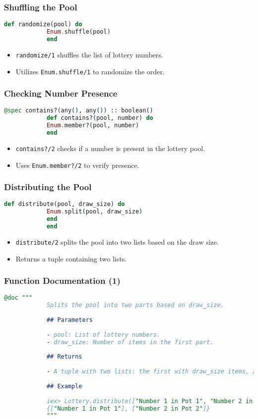 \documentclass[aspectratio=169, table]{beamer}
\begin{document}
	\begin{frame}[fragile]
		\frametitle{Shuffling the Pool}
		\begin{lstlisting}[language=Elixir]
			def randomize(pool) do
			Enum.shuffle(pool)
			end
		\end{lstlisting}
		\begin{itemize}
			\item \texttt{randomize/1} shuffles the list of lottery numbers.
			\item Utilizes \texttt{Enum.shuffle/1} to randomize the order.
		\end{itemize}
	\end{frame}
	
	\begin{frame}[fragile]
		\frametitle{Checking Number Presence}
		\begin{lstlisting}[language=Elixir]
			@spec contains?(any(), any()) :: boolean()
			def contains?(pool, number) do
			Enum.member?(pool, number)
			end
		\end{lstlisting}
		\begin{itemize}
			\item \texttt{contains?/2} checks if a number is present in the lottery pool.
			\item Uses \texttt{Enum.member?/2} to verify presence.
		\end{itemize}
	\end{frame}
	
	\begin{frame}[fragile]
		\frametitle{Distributing the Pool}
		\begin{lstlisting}[language=Elixir]
			def distribute(pool, draw_size) do
			Enum.split(pool, draw_size)
			end
			end
		\end{lstlisting}
		\begin{itemize}
			\item \texttt{distribute/2} splits the pool into two lists based on the draw size.
			\item Returns a tuple containing two lists.
		\end{itemize}
	\end{frame}
	
	\begin{frame}[fragile]
		\frametitle{Function Documentation (1)}
		\begin{lstlisting}[language=Elixir]
			@doc """
			Splits the pool into two parts based on draw_size.
			
			## Parameters
			
			- pool: List of lottery numbers.
			- draw_size: Number of items in the first part.
			
			## Returns
			
			- A tuple with two lists: the first with draw_size items, and the second with the rest.
			
			## Example
			
			iex> Lottery.distribute(["Number 1 in Pot 1", "Number 2 in Pot 2"], 1)
			{["Number 1 in Pot 1"], ["Number 2 in Pot 2"]}
			"""
		\end{lstlisting}
	\end{frame}
\end{document}
